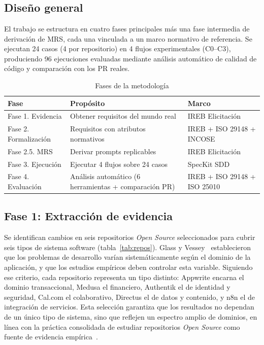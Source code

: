 \chapter{\methodologyname}
\label{chap:metodologia}

\section{Dise\~no general}

El trabajo se estructura en cuatro fases principales m\'as una fase intermedia de derivaci\'on de MRS, cada una vinculada a un marco normativo de referencia. Se ejecutan 24 casos (4 por repositorio) en 4 flujos experimentales (C0--C3), produciendo 96 ejecuciones evaluadas mediante an\'alisis autom\'atico de calidad de c\'odigo y comparaci\'on con los PR reales.

\begin{table}[htbp]
\centering
\caption{Fases de la metodolog\'ia}
\label{tab:fases}
\begin{tabularx}{\textwidth}{lXl}
\toprule
\textbf{Fase} & \textbf{Prop\'osito} & \textbf{Marco} \\
\midrule
Fase 1. Evidencia & Obtener requisitos del mundo real & IREB Elicitaci\'on \\
Fase 2. Formalizaci\'on & Requisitos con atributos normativos & IREB + ISO 29148 + INCOSE \\
Fase 2.5. MRS & Derivar prompts replicables & IREB Elicitaci\'on \\
Fase 3. Ejecuci\'on & Ejecutar 4 flujos sobre 24 casos & SpecKit SDD \\
Fase 4. Evaluaci\'on & An\'alisis autom\'atico (6 herramientas + comparaci\'on PR) & IREB + ISO 29148 + ISO 25010 \\
\bottomrule
\end{tabularx}
\end{table}

\section{Fase 1: Extracci\'on de evidencia}

Se identifican cambios en seis repositorios \emph{Open Source} seleccionados para cubrir seis tipos de sistema software (tabla~\ref{tab:repos}). Glass y Vessey~\cite{glass1995taxonomy} establecieron que los problemas de desarrollo var\'ian sistem\'aticamente seg\'un el dominio de la aplicaci\'on, y que los estudios emp\'iricos deben controlar esta variable. Siguiendo ese criterio, cada repositorio representa un tipo distinto: Appwrite encarna el dominio transaccional, Medusa el financiero, Authentik el de identidad y seguridad, Cal.com el colaborativo, Directus el de datos y contenido, y n8n el de integraci\'on de servicios. Esta selecci\'on garantiza que los resultados no dependan de un \'unico tipo de sistema, sino que reflejen un espectro amplio de dominios, en l\'inea con la pr\'actica consolidada de estudiar repositorios \emph{Open Source} como fuente de evidencia emp\'irica~\cite{hassan2019msr}.

